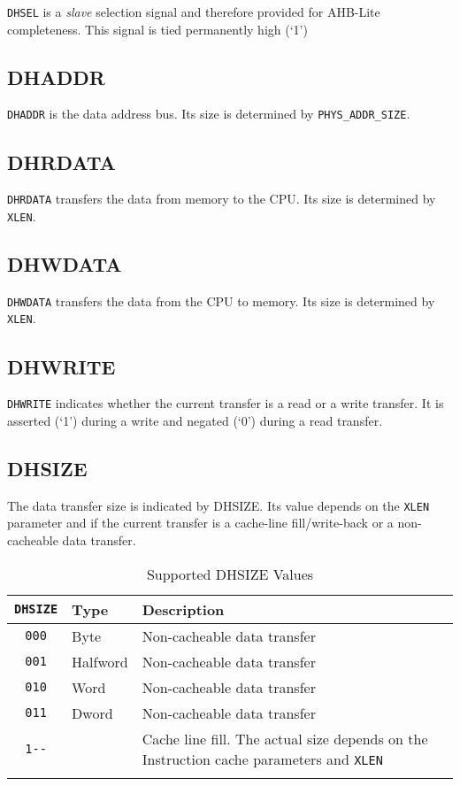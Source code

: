 \texttt{DHSEL} is a \emph{slave} selection signal and therefore provided for AHB-Lite
completeness. This signal is tied permanently high (`1')

\subsection{DHADDR}\label{dhaddr}

\texttt{DHADDR} is the data address bus. Its size is determined by
\texttt{PHYS\_ADDR\_SIZE}.

\subsection{DHRDATA}\label{dhrdata}

\texttt{DHRDATA} transfers the data from memory to the CPU. Its size is
determined by \texttt{XLEN}.

\subsection{DHWDATA}\label{dhwdata}

\texttt{DHWDATA} transfers the data from the CPU to memory. Its size is
determined by \texttt{XLEN}.

\subsection{DHWRITE}\label{dhwrite}

\texttt{DHWRITE} indicates whether the current transfer is a read or a write
transfer. It is asserted (`1') during a write and negated (`0') during a
read transfer.

\subsection{DHSIZE}\label{dhsize}

The data transfer size is indicated by DHSIZE. Its value depends on the
\texttt{XLEN} parameter and if the current transfer is a cache-line
fill/write-back or a non-cacheable data transfer.

\begin{longtable}[]{@{}clp{7.5cm}@{}}
\toprule
\texttt{DHSIZE} & Type & Description\tabularnewline
\midrule
\endhead
\texttt{000}   & Byte     & Non-cacheable data transfer\tabularnewline
\texttt{001}   & Halfword & Non-cacheable data transfer\tabularnewline
\texttt{010}   & Word     & Non-cacheable data transfer\tabularnewline
\texttt{011}   & Dword    & Non-cacheable data transfer\tabularnewline
\texttt{1-\/-} &          & Cache line fill. The actual size depends on the Instruction cache parameters and \texttt{XLEN}\tabularnewline
\bottomrule
\caption{Supported DHSIZE Values}
\label{tab:dhsize-values}
\end{longtable}

